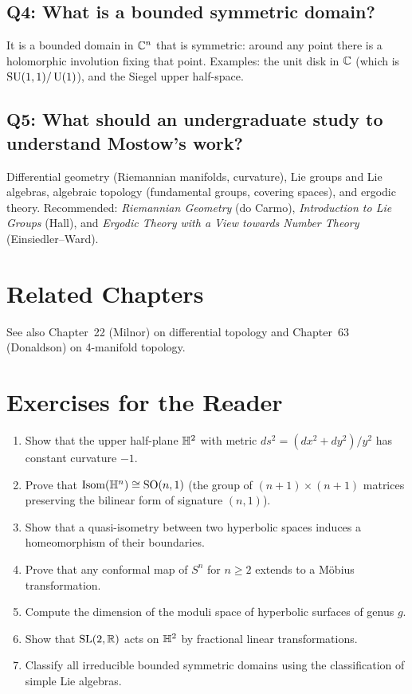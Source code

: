 \subsection*{Q4: What is a bounded symmetric domain?}
It is a bounded domain in $\mathbb{C}^n$ that is symmetric: around any point there is a holomorphic involution fixing that point. Examples: the unit disk in $\mathbb{C}$ (which is $\operatorname{SU}(1,1)/\operatorname{U}(1)$), and the Siegel upper half-space.

\subsection*{Q5: What should an undergraduate study to understand Mostow's work?}
Differential geometry (Riemannian manifolds, curvature), Lie groups and Lie algebras, algebraic topology (fundamental groups, covering spaces), and ergodic theory. Recommended: \textit{Riemannian Geometry} (do Carmo), \textit{Introduction to Lie Groups} (Hall), and \textit{Ergodic Theory with a View towards Number Theory} (Einsiedler--Ward).

\section{Related Chapters}
See also Chapter~22 (Milnor) on differential topology and Chapter~63 (Donaldson) on 4-manifold topology.

\section*{Exercises for the Reader}

\begin{enumerate}
    \item [B] Show that the upper half-plane $\mathbb{H}^2$ with metric $ds^2 = (dx^2 + dy^2)/y^2$ has constant curvature $-1$.
    \item [I] Prove that $\operatorname{Isom}(\mathbb{H}^n) \cong \operatorname{SO}(n,1)$ (the group of $(n+1)\times(n+1)$ matrices preserving the bilinear form of signature $(n,1)$).
    \item [A] Show that a quasi-isometry between two hyperbolic spaces induces a homeomorphism of their boundaries.
    \item [I] Prove that any conformal map of $S^n$ for $n \geq 2$ extends to a M\"obius transformation.
    \item [B] Compute the dimension of the moduli space of hyperbolic surfaces of genus $g$.
    \item [B] Show that $\operatorname{SL}(2,\mathbb{R})$ acts on $\mathbb{H}^2$ by fractional linear transformations.
    \item [A] Classify all irreducible bounded symmetric domains using the classification of simple Lie algebras.
\end{enumerate}

